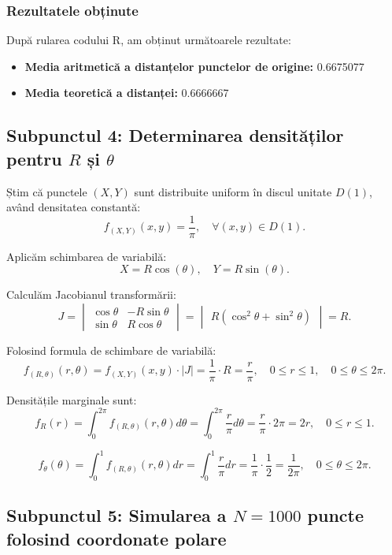 \documentclass{article}
\begin{document}
\subsubsection*{Rezultatele obținute}

După rularea codului R, am obținut următoarele rezultate:

\begin{itemize}
    \item \textbf{Media aritmetică a distanțelor punctelor de origine:} 0.6675077
    \item \textbf{Media teoretică a distanței:} 0.6666667
\end{itemize}

\subsection{Subpunctul 4: Determinarea densităților pentru $ R $ și $ \theta $}

Știm că punctele \( (X, Y) \) sunt distribuite uniform în discul unitate \( D(1) \), având densitatea constantă:
\[
f_{(X,Y)}(x,y) = \frac{1}{\pi}, \quad \forall (x,y) \in D(1).
\]

Aplicăm schimbarea de variabilă:
\[
X = R \cos(\theta), \quad Y = R \sin(\theta).
\]

Calculăm Jacobianul transformării:
\[
J = \begin{vmatrix} 
\cos\theta & -R\sin\theta \\
\sin\theta & R\cos\theta 
\end{vmatrix}
= \begin{vmatrix} 
R (\cos^2\theta + \sin^2\theta) 
\end{vmatrix} = R.
\]

Folosind formula de schimbare de variabilă:
\[
f_{(R,\theta)}(r, \theta) = f_{(X,Y)}(x,y) \cdot |J| = \frac{1}{\pi} \cdot R = \frac{r}{\pi}, \quad 0 \leq r \leq 1, \quad 0 \leq \theta \leq 2\pi.
\]

Densitățile marginale sunt:
\[
f_R(r) = \int_0^{2\pi} f_{(R, \theta)}(r, \theta) d\theta = \int_0^{2\pi} \frac{r}{\pi} d\theta = \frac{r}{\pi} \cdot 2\pi = 2r, \quad 0 \leq r \leq 1.
\]

\[
f_\theta(\theta) = \int_0^1 f_{(R, \theta)}(r, \theta) dr = \int_0^1 \frac{r}{\pi} dr = \frac{1}{\pi} \cdot \frac{1}{2} = \frac{1}{2\pi}, \quad 0 \leq \theta \leq 2\pi.
\]


\newpage

\newpage

\subsection{Subpunctul 5: Simularea a $N = 1000$ puncte folosind coordonate polare}
\end{document}
